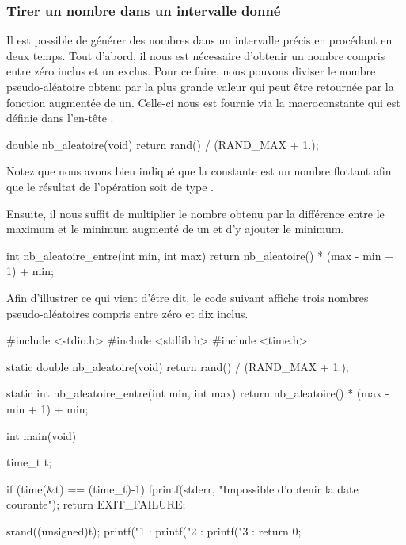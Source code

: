 \subsubsection{Tirer un nombre dans un intervalle donné}
\label{tirer-un-nombre-dans-un-intervalle-donne}

Il est possible de générer des nombres dans un intervalle précis en
procédant en deux temps. Tout d'abord, il nous est nécessaire d'obtenir
un nombre compris entre zéro inclus et un exclus. Pour ce faire, nous
pouvons diviser le nombre pseudo-aléatoire obtenu par la plus grande
valeur qui peut être retournée par la fonction  augmentée
de un. Celle-ci nous est fournie via la macroconstante
 qui est définie dans l'en-tête
.

\begin{C}
double nb_aleatoire(void)
{
    return rand() / (RAND_MAX + 1.);
}
\end{C}

Notez que nous avons bien indiqué que la constante  est un
nombre flottant afin que le résultat de l'opération soit de type
.

Ensuite, il nous suffit de multiplier le nombre obtenu par la différence
entre le maximum et le minimum augmenté de un et d'y ajouter le minimum.

\begin{C}
int nb_aleatoire_entre(int min, int max)
{
    return nb_aleatoire() * (max - min + 1) + min;
}
\end{C}

Afin d'illustrer ce qui vient d'être dit, le code suivant affiche trois
nombres pseudo-aléatoires compris entre zéro et dix inclus.

\begin{C}
#include <stdio.h>
#include <stdlib.h>
#include <time.h>


static double nb_aleatoire(void)
{
    return rand() / (RAND_MAX + 1.);
}


static int nb_aleatoire_entre(int min, int max)
{
    return nb_aleatoire() * (max - min + 1) + min;
}


int main(void)
{
    time_t t;

    if (time(&t) == (time_t)-1)
    {
        fprintf(stderr, "Impossible d'obtenir la date courante\n");
        return EXIT_FAILURE;
    }

    srand((unsigned)t);
    printf("1 : %
    printf("2 : %
    printf("3 : %
    return 0;
}
\end{C}

